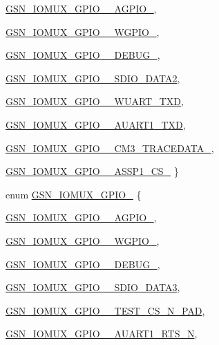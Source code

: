 \begin{DoxyCompactItemize}
\hyperlink{a00519_aaf45619e34942d75bfc7e204f9074436a6d96650df612e89e0a675974a0509ba2}{GSN\_\-IOMUX\_\-GPIO\_\_\-AGPIO\_}, 
\par
\hyperlink{a00519_aaf45619e34942d75bfc7e204f9074436aac87f31c63b74bb3d388ad14f443d3af}{GSN\_\-IOMUX\_\-GPIO\_\_\-WGPIO\_}, 
\par
\hyperlink{a00519_aaf45619e34942d75bfc7e204f9074436a90415982725bc5f31cb3dd6892f9a1fb}{GSN\_\-IOMUX\_\-GPIO\_\_\-DEBUG\_}, 
\par
\hyperlink{a00519_aaf45619e34942d75bfc7e204f9074436a5baf1289a70530931bd50bc6dd1bf224}{GSN\_\-IOMUX\_\-GPIO\_\_\-SDIO\_\-DATA2}, 
\par
\hyperlink{a00519_aaf45619e34942d75bfc7e204f9074436a3208506042d3a13dbcc951c746de3500}{GSN\_\-IOMUX\_\-GPIO\_\_\-WUART\_\-TXD}, 
\par
\hyperlink{a00519_aaf45619e34942d75bfc7e204f9074436a6d9ff5c2361eee2bf31feecc1c6557f1}{GSN\_\-IOMUX\_\-GPIO\_\_\-AUART1\_\-TXD}, 
\par
\hyperlink{a00519_aaf45619e34942d75bfc7e204f9074436a47ff3498e917e149d356610c7d3b72d6}{GSN\_\-IOMUX\_\-GPIO\_\_\-CM3\_\-TRACEDATA\_}, 
\par
\hyperlink{a00519_aaf45619e34942d75bfc7e204f9074436a8f6e86c7af939851c483a676e8160ba1}{GSN\_\-IOMUX\_\-GPIO\_\_\-ASSP1\_\-CS\_}
 \}
\item 
enum \hyperlink{a00519_a86bd2b64215669b8a05236cfa417de58}{GSN\_\-IOMUX\_\-GPIO\_} \{ \par
\hyperlink{a00519_a86bd2b64215669b8a05236cfa417de58a5d081616760bcf612c3196e55e5120da}{GSN\_\-IOMUX\_\-GPIO\_\_\-AGPIO\_}, 
\par
\hyperlink{a00519_a86bd2b64215669b8a05236cfa417de58aa0c8a8c48bd9378f44eca3aab07e0b22}{GSN\_\-IOMUX\_\-GPIO\_\_\-WGPIO\_}, 
\par
\hyperlink{a00519_a86bd2b64215669b8a05236cfa417de58a65fb71cea7e59865ec66229205e68f39}{GSN\_\-IOMUX\_\-GPIO\_\_\-DEBUG\_}, 
\par
\hyperlink{a00519_a86bd2b64215669b8a05236cfa417de58a58b23ecb44a187c9d5b941845f6f795f}{GSN\_\-IOMUX\_\-GPIO\_\_\-SDIO\_\-DATA3}, 
\par
\hyperlink{a00519_a86bd2b64215669b8a05236cfa417de58a7a2d49f404f907b427a687a33ebe3b6f}{GSN\_\-IOMUX\_\-GPIO\_\_\-TEST\_\-CS\_\-N\_\-PAD}, 
\par
\hyperlink{a00519_a86bd2b64215669b8a05236cfa417de58a640adfee4f5034b6e21b5925bc8839e5}{GSN\_\-IOMUX\_\-GPIO\_\_\-AUART1\_\-RTS\_\-N}, 
\par

\end{DoxyCompactItemize}
